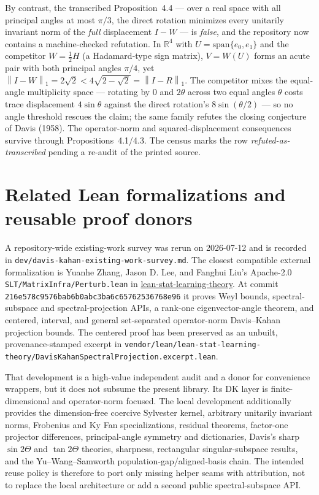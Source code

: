 \documentclass[11pt]{article}
\newcommand{\norm}[1]{\left\lVert #1\right\rVert}
\theoremstyle{remark}
\begin{document}
By contrast, the transcribed Proposition~4.4 --- over a real space with all
principal angles at most $\pi/3$, the direct rotation minimizes every
unitarily invariant norm of the \emph{full} displacement $I-W$ --- is
\emph{false}, and the repository now contains a machine-checked refutation.
In $\mathbb R^4$ with $U=\mathrm{span}\{e_0,e_1\}$ and the competitor
$W=\tfrac12H$ (a Hadamard-type sign matrix), $V=W(U)$ forms an acute pair
with both principal angles $\pi/4$, yet
$\norm{I-W}_1=2\sqrt2<4\sqrt{2-\sqrt2}=\norm{I-R}_1$.  The competitor mixes
the equal-angle multiplicity space --- rotating by $0$ and $2\theta$ across
two equal angles $\theta$ costs trace displacement $4\sin\theta$ against the
direct rotation's $8\sin(\theta/2)$ --- so no angle threshold rescues the
claim; the same family refutes the closing conjecture of Davis (1958).  The
operator-norm and squared-displacement consequences survive through
Propositions~4.1/4.3.  The census marks the row
\emph{refuted-as-transcribed} pending a re-audit of the printed source.


\section{Related Lean formalizations and reusable proof donors}

A repository-wide existing-work survey was rerun on 2026-07-12 and is recorded in
\texttt{dev/davis-kahan-existing-work-survey.md}.  The closest compatible external
formalization is Yuanhe Zhang, Jason D. Lee, and Fanghui Liu's Apache-2.0
\texttt{SLT/MatrixInfra/Perturb.lean} in
\href{https://github.com/YuanheZ/lean-stat-learning-theory}{lean-stat-learning-theory}.
At commit \texttt{216e578c9576bab6b0abc3ba6c65762536768e96} it proves Weyl bounds,
spectral-subspace and spectral-projection APIs, a rank-one eigenvector-angle theorem,
and centered, interval, and general set-separated operator-norm Davis--Kahan projection
bounds.  The centered proof has been preserved as an unbuilt, provenance-stamped excerpt in
\texttt{vendor/lean/lean-stat-learning-theory/DavisKahanSpectralProjection.excerpt.lean}.

That development is a high-value independent audit and a donor for convenience wrappers,
but it does not subsume the present library.  Its DK layer is finite-dimensional and
operator-norm focused.  The local development additionally provides the dimension-free
coercive Sylvester kernel, arbitrary unitarily invariant norms, Frobenius and Ky Fan
specializations, residual theorems, factor-one projector differences, principal-angle
symmetry and dictionaries, Davis's sharp $\sin 2\Theta$ and $\tan 2\Theta$ theories,
sharpness, rectangular singular-subspace results, and the Yu--Wang--Samworth
population-gap/aligned-basis chain.  The intended reuse policy is therefore to port only
missing helper seams with attribution, not to replace the local architecture or add a
second public spectral-subspace API.
\end{document}
